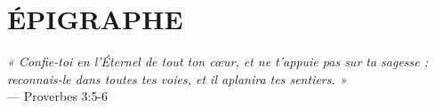 \thispagestyle{empty}
\chapter*{ÉPIGRAPHE}
\vspace{2cm}

\begin{flushright}
  \begin{minipage}{.72\linewidth}
    \textit{« Confie-toi en l'Éternel de tout ton cœur, et ne t'appuie pas sur ta sagesse ; reconnais-le dans toutes tes voies, et il aplanira tes sentiers. »}\\[.4cm]
    --- Proverbes 3:5-6
  \end{minipage}
\end{flushright}

\vspace{2.5cm}
\vfill